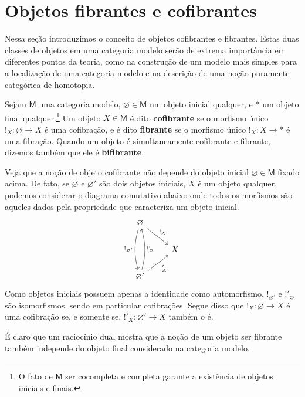 \section{Objetos fibrantes e cofibrantes}

Nessa seção introduzimos o conceito de objetos cofibrantes e fibrantes.
Estas duas classes de objetos em uma categoria modelo serão de extrema importância em diferentes pontos da teoria, como na construção de um modelo mais simples para a localização de uma categoria modelo e na descrição de uma noção puramente categórica de homotopia.

\begin{defin}
  Sejam $\mathsf{M}$ uma categoria modelo, $\varnothing \in \mathsf{M}$ um objeto inicial qualquer, e $*$ um objeto final qualquer.\footnote{O fato de $\mathsf{M}$ ser cocompleta e completa garante a existência de objetos iniciais e finais.} Um objeto $X \in \mathsf{M}$ é dito \textbf{cofibrante} se o morfismo único $!_{X}: \varnothing \to X$ é uma cofibração, e é dito \textbf{fibrante} se o morfismo único $!_{X}: X \to *$ é uma fibração.
  Quando um objeto é simultaneamente cofibrante e fibrante, dizemos também que ele é \textbf{bifibrante}.
\end{defin}

\begin{obs}\label{obs:cofibrante_fibrante_independe_objeto_inicial_final}
  Veja que a noção de objeto cofibrante não depende do objeto inicial $\varnothing \in \mathsf{M}$ fixado acima.
  De fato, se $\varnothing$ e $\varnothing'$ são dois objetos iniciais, $X$ é um objeto qualquer, podemos considerar o diagrama comutativo abaixo onde todos os morfismos são aqueles dados pela propriedade que caracteriza um objeto inicial.
  \begin{displaymath}
    \begin{tikzcd}
      \varnothing
      \arrow[rd, "!_{X}"]
      \arrow[dd, bend right=15, "!_{\varnothing'}" swap]
      \\ & X
      \\ \varnothing'
      \arrow[ru, "!'_{X}" swap]
      \arrow[uu, bend right=15, "!'_{\varnothing}" swap]
    \end{tikzcd}
  \end{displaymath}
  Como objetos iniciais possuem apenas a identidade como automorfismo, $!_{\varnothing'}$ e $!'_{\varnothing}$ são isomorfismos, sendo em particular cofibrações.
  Segue disso que $!_{X}: \varnothing \to X$ é uma cofibração se, e somente se, $!'_{X}: \varnothing' \to X$ também o é.

  É claro que um raciocínio dual mostra que a noção de um objeto ser fibrante também independe do objeto final considerado na categoria modelo.
\end{obs}

